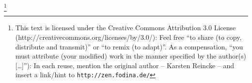 %
%
% 
% 
% 

\footnote{This text is licensed under the Creative Commons Attribution 3.0
License (http://creativecommons.org/licenses/by/3.0/): Feel free \enquote{to
share (to copy, distribute and transmit)} or \enquote{to remix (to adapt)}. As
a compensation, \enquote{you must attribute (your modified) work in the manner
specified by the author(s) [\ldots]}): In each reuse, mention the original
author -- Karsten Reincke -- and insert a link/hint to
\texttt{http://zen.fodina.de/} }


